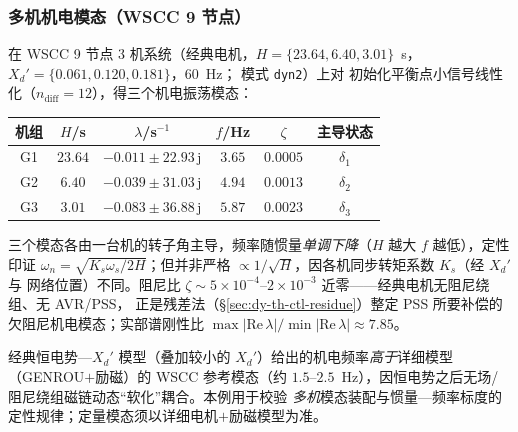 \subsubsection{多机机电模态（WSCC 9 节点）}\label{sec:dy-th-ctl-wscc}
在 WSCC 9 节点 3 机系统（经典电机，$H{=}\{23.64,6.40,3.01\}$~s，
$X_d'{=}\{0.061,0.120,0.181\}$，$60$~Hz； 模式 \texttt{dyn2}）上对
初始化平衡点小信号线性化（$n_{\mathrm{diff}}{=}12$），得三个机电振荡模态：
\begin{center}\footnotesize
\begin{tabular}{@{}cccccc@{}}
\toprule
机组 & $H$/s & $\lambda$/s$^{-1}$ & $f$/Hz & $\zeta$ & 主导状态\\
\midrule
G1 & $23.64$ & $-0.011\pm22.93\,\mathrm j$ & $3.65$ & $0.0005$ & $\delta_1$\\
G2 & $6.40$ & $-0.039\pm31.03\,\mathrm j$ & $4.94$ & $0.0013$ & $\delta_2$\\
G3 & $3.01$ & $-0.083\pm36.88\,\mathrm j$ & $5.87$ & $0.0023$ & $\delta_3$\\
\bottomrule
\end{tabular}
\end{center}
三个模态各由一台机的转子角主导，频率随惯量\emph{单调下降}（$H$ 越大 $f$ 越低），定性印证
$\omega_n=\sqrt{K_s\omega_s/2H}$；但并非严格 $\propto1/\sqrt H$，因各机同步转矩系数 $K_s$（经 $X_d'$ 与
网络位置）不同。阻尼比 $\zeta\sim5\times10^{-4}$--$2\times10^{-3}$ 近零——经典电机无阻尼绕组、无 AVR/PSS，
正是残差法（§\ref{sec:dy-th-ctl-residue}）整定 PSS 所要补偿的欠阻尼机电模态；实部谱刚性比
$\max|\mathrm{Re}\,\lambda|/\min|\mathrm{Re}\,\lambda|\approx7.85$。
\begin{remark}[经典模型的频率偏高]\label{rem:dy-th-ctl-wscc}
经典恒电势—$X_d'$ 模型（叠加较小的 $X_d'$）给出的机电频率\emph{高于}详细模型（GENROU$+$励磁）的
WSCC 参考模态（约 $1.5$--$2.5$~Hz），因恒电势之后无场/阻尼绕组磁链动态“软化”耦合。本例用于校验
\emph{多机}模态装配与惯量—频率标度的定性规律；定量模态须以详细电机$+$励磁模型为准。
\end{remark}

